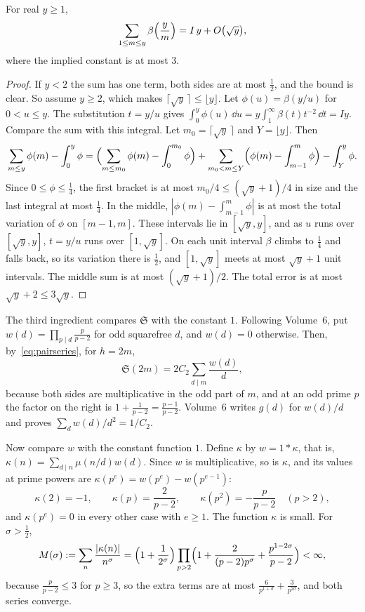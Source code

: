 \begin{lemma}\label{lem:riemannsum}
For real $y\ge1$,
\[
\sum_{1\le m\le y}\beta\Bigl(\frac ym\Bigr)=I\,y+O\bigl(\sqrt y\bigr),
\]
where the implied constant is at most $3$.
\end{lemma}
\begin{proof}
If $y<2$ the sum has one term, both sides are at most $\frac12$, and the bound is clear. So assume $y\ge2$, which makes $\lceil\sqrt y\,\rceil\le\lfloor y\rfloor$. Let $\phi(u)=\beta(y/u)$ for $0<u\le y$. The substitution $t=y/u$ gives $\int_0^y\phi(u)\,\dd u=y\int_1^\infty\beta(t)t^{-2}\,\dd t=Iy$. Compare the sum with this integral. Let $m_0=\lceil\sqrt y\,\rceil$ and $Y=\lfloor y\rfloor$. Then
\[
\sum_{m\le y}\phi(m)-\int_0^y\phi=\Bigl(\sum_{m\le m_0}\phi(m)-\int_0^{m_0}\phi\Bigr)+\sum_{m_0<m\le Y}\Bigl(\phi(m)-\int_{m-1}^m\phi\Bigr)-\int_Y^y\phi.
\]
Since $0\le\phi\le\frac14$, the first bracket is at most $m_0/4\le(\sqrt y+1)/4$ in size and the last integral at most $\frac14$. In the middle, $|\phi(m)-\int_{m-1}^m\phi|$ is at most the total variation of $\phi$ on $[m-1,m]$. These intervals lie in $[\sqrt y,y]$, and as $u$ runs over $[\sqrt y,y]$, $t=y/u$ runs over $[1,\sqrt y]$. On each unit interval $\beta$ climbs to $\frac14$ and falls back, so its variation there is $\frac12$, and $[1,\sqrt y]$ meets at most $\sqrt y+1$ unit intervals. The middle sum is at most $(\sqrt y+1)/2$. The total error is at most $\sqrt y+2\le3\sqrt y$.
\end{proof}

The third ingredient compares $\mathfrak S$ with the constant $1$. Following Volume~6, put $w(d)=\prod_{p\mid d}\frac p{p-2}$ for odd squarefree $d$, and $w(d)=0$ otherwise. Then, by~\eqref{eq:pairseries}, for $h=2m$,
\begin{equation}\label{eq:sdivisor}
\mathfrak S(2m)=2C_2\sum_{d\mid m}\frac{w(d)}d,
\end{equation}
because both sides are multiplicative in the odd part of $m$, and at an odd prime $p$ the factor on the right is $1+\frac1{p-2}=\frac{p-1}{p-2}$. Volume~6 writes $g(d)$ for $w(d)/d$ and proves $\sum_dw(d)/d^2=1/C_2$.

Now compare $w$ with the constant function $1$. Define $\kappa$ by $w=1*\kappa$, that is, $\kappa(n)=\sum_{d\mid n}\mu(n/d)w(d)$. Since $w$ is multiplicative, so is $\kappa$, and its values at prime powers are $\kappa(p^e)=w(p^e)-w(p^{e-1})$:
\[
\kappa(2)=-1,\qquad\kappa(p)=\frac2{p-2},\qquad\kappa(p^2)=-\frac p{p-2}\quad(p>2),
\]
and $\kappa(p^e)=0$ in every other case with $e\ge1$. The function $\kappa$ is small. For $\sigma>\frac12$,
\[
M(\sigma):=\sum_n\frac{|\kappa(n)|}{n^\sigma}=\Bigl(1+\frac1{2^\sigma}\Bigr)\prod_{p>2}\Bigl(1+\frac2{(p-2)p^\sigma}+\frac{p^{1-2\sigma}}{p-2}\Bigr)<\infty,
\]
because $\frac p{p-2}\le3$ for $p\ge3$, so the extra terms are at most $\frac6{p^{1+\sigma}}+\frac3{p^{2\sigma}}$, and both series converge.

